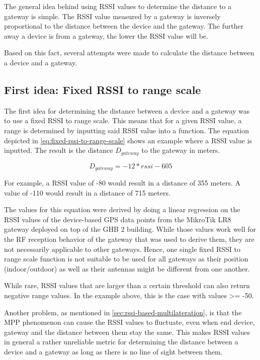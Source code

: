 The general idea behind using \ac{RSSI} values to determine the distance to a gateway is simple.
The \ac{RSSI} value measured by a gateway is inversely proportional to the distance between the device and the gateway.
The further away a device is from a gateway, the lower the \ac{RSSI} value will be.

Based on this fact, several attempts were made to calculate the distance between a device and a gateway.

\subsection{First idea: Fixed \acs{RSSI} to range scale}\label{sec:fixed-rssi-to-range-scale}

The first idea for determining the distance between a device and a gateway was to use a fixed \ac{RSSI} to range scale.
This means that for a given \ac{RSSI} value, a range is determined by inputting said \ac{RSSI} value into a function.
The equation depicted in \cref{eq:fixed-rssi-to-range-scale} shows an example where a \ac{RSSI} value is inputted.
The result is the distance $D_{gateway}$ to the gateway in meters.

\begin{equation}
    \label{eq:fixed-rssi-to-range-scale}
    D_{gateway} = -12 * rssi - 605
\end{equation}

For example, a \ac{RSSI} value of -80 would result in a distance of 355 meters.
A value of -110 would result in a distance of 715 meters.

The values for this equation were derived by doing a linear regression on the \ac{RSSI} values of the device-based GPS data points from the MikroTik LR8 gateway deployed on top of the \ac{GHB} 2 building.
While those values work well for the \ac{RF} reception behavior of the gateway that was used to derive them, they are not necessarily applicable to other gateways.
Hence, one single fixed \ac{RSSI} to range scale function is not suitable to be used for all gateways as their position (indoor/outdoor) as well as their antennas might be different from one another.

While rare, \ac{RSSI} values that are larger than a certain threshold can also return negative range values.
In the example above, this is the case with values >= -50.

Another problem, as mentioned in \cref{sec:rssi-based-multilateration}, is that the \ac{MPP} phenomenon can cause the \ac{RSSI} values to fluctuate, even when end device, gateway and the distance between them stay the same.
This makes RSSI values in general a rather unreliable metric for determining the distance between a device and a gateway as long as there is no line of sight between them.

